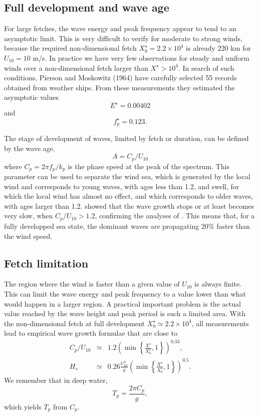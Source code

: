 \subsection{Full development and wave age}
For large fetches, the wave energy and peak frequency appear to tend to an asymptotic limit. 
This is very difficult to verify for moderate to strong winds, because the required non-dimensional fetch 
$X^\star_0=2.2 \times 10^4$ is already 220 km for $U_{10}= 10$ m/s. 
In practice we have very few observations for steady and uniform winds over a non-dimensional fetch larger than  $X^\star
> 10^4$. In search of such conditions, Pierson and Moskowitz
(1964\nocite{Pierson&Moskowitz1964}) have carefully selected 
55 records obtained from weather ships. From these measurements they estimated the asymptotic values  
\begin{equation}
E^\star=0.00402
 \end{equation}
 and
\begin{equation}
f_p^\star=0.123.
\end{equation}

The stage of development of waves, limited by fetch or duration, can be defined 
by the wave age, 
\begin{equation}
 A=C_p / U_{10}
\end{equation} where $C_p=2 \pi f_p/k_p$ is the phase speed at the peak of the spectrum. 
This parameter can be used to separate the wind sea, which is generated by the local wind and corresponds to 
young waves, with ages less than 1.2, and swell, for which the local wind has almost no effect, 
and which corresponds to older waves, with ages larger than 1.2. \cite{Donelan&al.1992} showed that 
the wave growth stops or at least becomes very slow, when  $C_p / U_{10} > 1.2$, confirming the analyses of \cite{Pierson&Moskowitz1964}. 
This means that, for a fully developped sea state, the dominant waves are propagating 20\% faster than the wind speed. 

\subsection{Fetch limitation}
The region where the wind is faster than a given value of  $U_{10}$ is always finite. This can limit the wave energy and peak frequency to a value 
lower than what would happen in a larger region. A practical important problem is the actual value reached by the wave height and peak period is 
such a limited area. With the non-dimensional fetch at full development $ X^\star_0 \simeq 2.2 \times 10^4$, all measurements lead to empirical 
wave growth formulae that are close to
\begin{eqnarray}
   C_p/U_{10}  & \simeq &  1.2  \left(\min
   \left\{\frac{X^\star}{X^\star_0},1\right\}\right)^{0.33},\label{ageElf}\\
   H_s  & \simeq &  0.26 \frac{U_{10}^2}{g}\left(\min
   \left\{\frac{X^\star}{X^\star_0},1\right\}\right)^{0.5}.\label{Hs_fetch}
\end{eqnarray}
We remember that in deep water, 
\begin{equation}
T_p = \frac{2 \pi C_p}{g},
\end{equation}
which yields $T_p$ from $C_p$.

